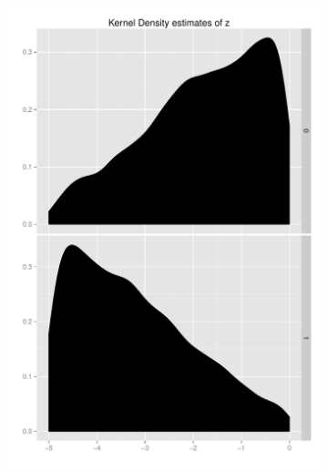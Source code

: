 \documentclass[11pt,letterpaper]{article}
\begin{document}
\begin{landscape}
\begin{figure}[h]
	\begin{subfigure}[b]{0.3\textwidth}\centering \includegraphics[width=1\textwidth]{z}  \end{subfigure}

\end{figure}
\end{landscape}
\end{document}
